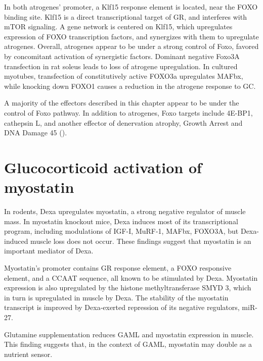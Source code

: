 \documentclass[12pt,english]{report}\usepackage[]{graphicx}\usepackage[]{color}
\begin{document}
In both atrogenes' promoter, a Klf15 response element is located,
near the FOXO binding site\citep{shimizu2011crosstalk}. Klf15 is
a direct transcriptional target of GR, and interferes with mTOR signaling.
A gene network is centered on Klf15, which upregulates expression
of FOXO transcription factors, and synergizes with them to upregulate
atrogenes. Overall, atrogenes appear to be under a strong control
of Foxo, favored by concomitant activation of synergistic factors.
Dominant negative Foxo3A transfection in rat soleus leads to loss
of atrogene upregulation\citep{senf2008hsp70}. In cultured myotubes,
transfection of constitutively active FOXO3a upregulates MAFbx\citep{sandri2004foxo},
while knocking down FOXO1 causes a reduction in the atrogene response
to GC\citep{smith2010sepsisa}.

A majority of the effectors described in this chapter appear to be
under the control of Foxo pathway. In addition to atrogenes, Foxo
targets include 4E-BP1, cathepsin L, and another effector of denervation
atrophy, Growth Arrest and DNA Damage 45 ()\citep{bongers2013skeletal}.


\section{Glucocorticoid activation of myostatin}

In rodents, Dexa upregulates myostatin, a strong negative regulator
of muscle mass\citep{ma2003glucocorticoid-induced}. In myostatin
knockout mice, Dexa induces most of its transcriptional program, including
modulations of IGF-I, MuRF-1, MAFbx, FOXO3A, but Dexa-induced muscle
loss does not occur\citep{gilson2007myostatin}. These findings suggest
that myostatin is an important mediator of Dexa.

Myostatin's promoter contains GR response element\citep{ma2003glucocorticoid-induced},
a FOXO responsive element\citep{allen2007regulation}, and a CCAAT
sequence\citep{allen2010ccaat/enhancer}, all known to be stimulated
by Dexa. Myostatin expression is also upregulated by the histone methyltransferase
SMYD 3, which in turn is upregulated in muscle by Dexa\citep{proserpio2013methyltransferase}.
The stability of the myostatin transcript is improved by Dexa-exerted
repression of its negative regulators, miR-27\citep{allen2011posttranscriptional}.

Glutamine supplementation reduces GAML and myostatin expression in
muscle\citep{salehian2006effect}. This finding suggests that, in
the context of GAML, myostatin may double as a nutrient sensor. 
\end{document}
